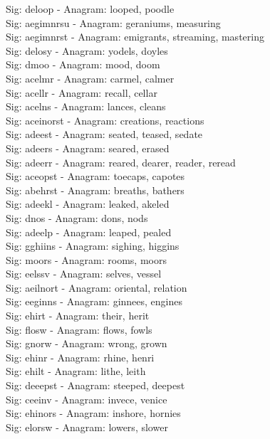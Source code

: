 Sig: {deloop} - Anagram: looped, poodle \\
Sig: {aegimnrsu} - Anagram: geraniums, measuring \\
Sig: {aegimnrst} - Anagram: emigrants, streaming, mastering \\
Sig: {delosy} - Anagram: yodels, doyles \\
Sig: {dmoo} - Anagram: mood, doom \\
Sig: {acelmr} - Anagram: carmel, calmer \\
Sig: {acellr} - Anagram: recall, cellar \\
Sig: {acelns} - Anagram: lances, cleans \\
Sig: {aceinorst} - Anagram: creations, reactions \\
Sig: {adeest} - Anagram: seated, teased, sedate \\
Sig: {adeers} - Anagram: seared, erased \\
Sig: {adeerr} - Anagram: reared, dearer, reader, reread \\
Sig: {aceopst} - Anagram: toecaps, capotes \\
Sig: {abehrst} - Anagram: breaths, bathers \\
Sig: {adeekl} - Anagram: leaked, akeled \\
Sig: {dnos} - Anagram: dons, nods \\
Sig: {adeelp} - Anagram: leaped, pealed \\
Sig: {gghiins} - Anagram: sighing, higgins \\
Sig: {moors} - Anagram: rooms, moors \\
Sig: {eelssv} - Anagram: selves, vessel \\
Sig: {aeilnort} - Anagram: oriental, relation \\
Sig: {eeginns} - Anagram: ginnees, engines \\
Sig: {ehirt} - Anagram: their, herit \\
Sig: {flosw} - Anagram: flows, fowls \\
Sig: {gnorw} - Anagram: wrong, grown \\
Sig: {ehinr} - Anagram: rhine, henri \\
Sig: {ehilt} - Anagram: lithe, leith \\
Sig: {deeepst} - Anagram: steeped, deepest \\
Sig: {ceeinv} - Anagram: invece, venice \\
Sig: {ehinors} - Anagram: inshore, hornies \\
Sig: {elorsw} - Anagram: lowers, slower \\
